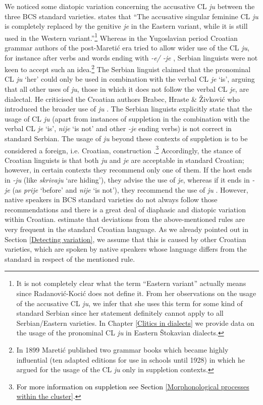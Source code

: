 We noticed some diatopic variation concerning the accusative CL \textit{ju} between the three BCS standard varieties. \citet[56]{RadanovicKocic88} states that “The accusative singular feminine CL \textit{ju} is completely replaced by the genitive \textit{je} in the Eastern variant, while it is still used in the Western variant.''\footnote{It is not completely clear what the term ``Eastern variant'' actually means since Radanović-Kocić does not define it. From her observations on the usage of the accusative CL \textit{ju}, we infer that she uses this term for some kind of standard Serbian since her statement definitely cannot apply to all Serbian/Eastern varieties. In Chapter \ref{Clitics in dialects} we provide data on the usage of the pronominal CL \textit{ju} in Eastern Štokavian dialects.} Whereas in the Yugoslavian period Croatian grammar authors of the post-Maretić era tried to allow wider use of the CL \textit{ju}, for instance after verbs and words ending with \textit{-e/ -je} \citep[cf.][187]{Mamic95}, Serbian linguists were not keen to accept such an idea.\footnote{In 1899 Maretić published two grammar books which became highly influential (ten adapted editions for use in schools until 1928) in which he argued for the usage of the CL \textit{ju} only in suppletion contexts.} The Serbian linguist \citet[306]{Stevanovic75} claimed that the pronominal CL \textit{ju} `her' could only be used in combination with the verbal CL \textit{je} `is', arguing that all other uses of \textit{ju}, those in which it does not follow the verbal CL \textit{je}, are dialectal. He criticised the Croatian authors Brabec, Hraste \& Živković who introduced the broader use of \textit{ju} \citep[cf.][306]{Stevanovic75}. The Serbian linguists \citet[97]{PiperKlajn14} explicitly state that the usage of CL \textit{ju} (apart from instances of suppletion in the combination with the verbal CL \textit{je} `is', \textit{nije} `is not' and other \textit{-je} ending verbs) is not correct in standard Serbian. The usage of \textit{ju} beyond these contexts of suppletion is to be considered a foreign, i.e. Croatian, construction \citep[cf.][97]{PiperKlajn14}.\footnote{\textcolor{black}{For more information on suppletion see Section \ref{Morphonological processes within the cluster}}.} Accordingly, the stance of Croatian linguists \citet[143]{FrancicPetrovic13} is that both \textit{ju} and \textit{je} are acceptable in standard Croatian; however, in certain contexts they recommend only one of them. If the host ends in \textit{-ju} (like \textit{skrivaju} `are hiding'), they advise the use of \textit{je}, whereas if it ends in \textit{-je} (as \textit{prije} `before' and \textit{nije} `is not'), they recommend the use of \textit{ju} \citep[cf.][143]{FrancicPetrovic13}. However, native speakers in BCS standard varieties do not always follow those recommendations and there is a great deal of diaphasic and diatopic variation within Croatian. \citet[143]{FrancicPetrovic13} estimate that deviations from the above-mentioned rules are very frequent in the standard Croatian language. As we already pointed out in Section \ref{Detecting variation}, we assume that this is caused by other Croatian varieties, which are spoken by native speakers whose language differs from the standard in respect of the mentioned rule. 

